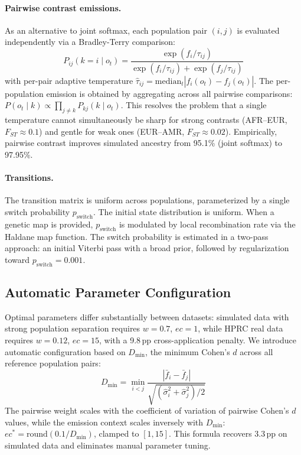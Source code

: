 \paragraph{Pairwise contrast emissions.}
\label{sec:pairwise_contrast}
As an alternative to joint softmax, each population pair $(i, j)$ is evaluated independently via a Bradley-Terry comparison:
\begin{equation}
P_{ij}(k = i \mid o_t) = \frac{\exp(f_i / \tau_{ij})}{\exp(f_i / \tau_{ij}) + \exp(f_j / \tau_{ij})}
\end{equation}
with per-pair adaptive temperature $\hat{\tau}_{ij} = \text{median}_t |f_i(o_t) - f_j(o_t)|$. The per-population emission is obtained by aggregating across all pairwise comparisons: $P(o_t \mid k) \propto \prod_{j \neq k} P_{kj}(k \mid o_t)$. This resolves the problem that a single temperature cannot simultaneously be sharp for strong contrasts (AFR--EUR, $F_{ST} \approx 0.1$) and gentle for weak ones (EUR--AMR, $F_{ST} \approx 0.02$). Empirically, pairwise contrast improves simulated ancestry from 95.1\% (joint softmax) to 97.95\%.

\paragraph{Transitions.}
The transition matrix is uniform across populations, parameterized by a single switch probability $p_{\text{switch}}$. The initial state distribution is uniform. When a genetic map is provided, $p_{\text{switch}}$ is modulated by local recombination rate via the Haldane map function. The switch probability is estimated in a two-pass approach: an initial Viterbi pass with a broad prior, followed by regularization toward $p_{\text{switch}} = 0.001$.

\subsection{Automatic Parameter Configuration}
\label{sec:auto_configure}

Optimal parameters differ substantially between datasets: simulated data with strong population separation requires $w = 0.7$, $ec = 1$, while HPRC real data requires $w = 0.12$, $ec = 15$, with a 9.8\,pp cross-application penalty. We introduce automatic configuration based on $D_{\min}$, the minimum Cohen's $d$ across all reference population pairs:
\begin{equation}
D_{\min} = \min_{i < j} \frac{|\bar{f}_i - \bar{f}_j|}{\sqrt{(\hat{\sigma}_i^2 + \hat{\sigma}_j^2)/2}}
\end{equation}
The pairwise weight scales with the coefficient of variation of pairwise Cohen's $d$ values, while the emission context scales inversely with $D_{\min}$: $ec^* = \text{round}(0.1/D_{\min})$, clamped to $[1, 15]$. This formula recovers 3.3\,pp on simulated data and eliminates manual parameter tuning.

